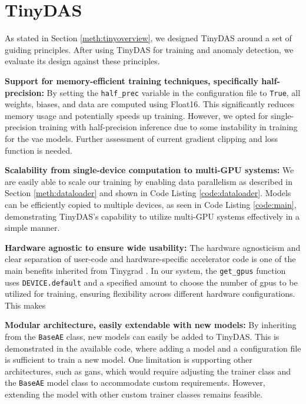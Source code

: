 \section{TinyDAS}
\label{disc:tinydas}

As stated in Section \ref{meth:tinyoverview}, we designed TinyDAS around a set of guiding principles. After using TinyDAS for training and anomaly detection, we evaluate its design against these principles.

\textbf{Support for memory-efficient training techniques, specifically half-precision:}
By setting the \lstinline|half_prec| variable in the configuration file to \lstinline|True|, all weights, biases, and data are computed using Float16. This significantly reduces memory usage and potentially speeds up training. However, we opted for single-precision training with half-precision inference due to some instability in training for the \acrshort{vae} models. Further assessment of current gradient clipping and loss function is needed.

\textbf{Scalability from single-device computation to multi-GPU systems:}
We are easily able to scale our training by enabling data parallelism as described in Section \ref{meth:dataloader} and shown in Code Listing \ref{code:dataloader}. Models can be efficiently copied to multiple devices, as seen in Code Listing \ref{code:main}, demonstrating TinyDAS's capability to utilize multi-GPU systems effectively in a simple manner.

\textbf{Hardware agnostic to ensure wide usability:}
The hardware agnosticism and clear separation of user-code and hardware-specific accelerator code is one of the main benefits inherited from Tinygrad \cite{tinygrad}. In our system, the \lstinline|get_gpus| function uses \lstinline|DEVICE.default| and a specified amount to choose the number of \acrshort{gpu}s to be utilized for training, ensuring flexibility across different hardware configurations. This makes 

\textbf{Modular architecture, easily extendable with new models:}
By inheriting from the \lstinline|BaseAE| class, new models can easily be added to TinyDAS. This is demonstrated in the available code, where adding a model and a configuration file is sufficient to train a new model. One limitation is supporting other architectures, such as \acrshort{gan}s, which would require adjusting the trainer class and the \lstinline|BaseAE| model class to accommodate custom requirements. However, extending the model with other custom trainer classes remains feasible.

